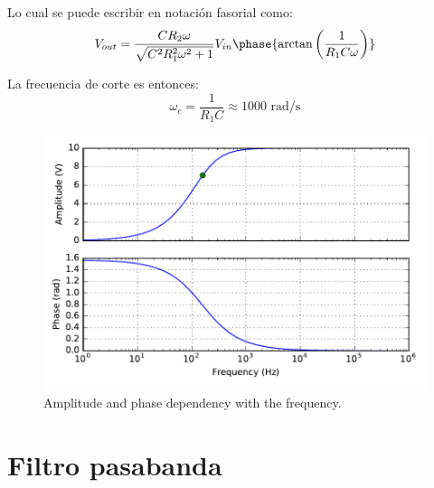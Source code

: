\documentclass[11pt]{article}
\begin{document}
\noindent Lo cual se puede escribir en notaci\'on fasorial como:
\begin{equation}
	V_{out} = \dfrac{C R_{2}\omega}{\sqrt{C^{2} R_{1}^{2} \omega^{2} + 1}} V_{in}\phase{\arctan\left(\dfrac{1}{R_1C\omega}\right)}
\end{equation}

\noindent La frecuencia de corte es entonces:
\begin{equation}
	\omega_c = \dfrac{1}{R_1C} \approx 1000 \text{ rad/s}
\end{equation}

\pagebreak
\begin{figure}[h]
	\centering
	\includegraphics[width=0.5\linewidth]{filter.pdf}
	\caption{Amplitude and phase dependency with the frequency.}
\end{figure}

\section{Filtro pasabanda}
\end{document}
